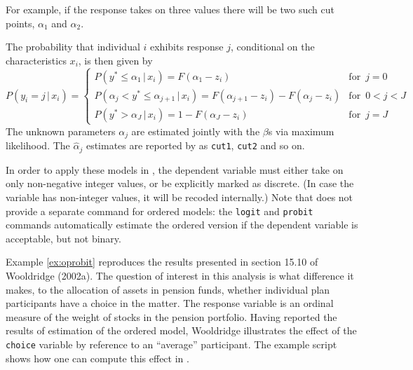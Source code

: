 For example, if the response takes on three values there will be two
such cut points, $\alpha_1$ and $\alpha_2$.

The probability that individual $i$ exhibits response $j$, conditional
on the characteristics $x_i$, is then given by
%
\begin{equation}
  \label{eq:QR-ordered}
  P(y_i = j \,|\, x_i) = \left\{
    \begin{array}{ll}
      P(y^* \leq \alpha_1 \,|\, x_i) = F(\alpha_1 - z_i) & \textrm{for }\, j = 0 \\
      P(\alpha_j < y^* \leq \alpha_{j+1} \,|\, x_i) = 
      F(\alpha_{j+1} - z_i) -  F(\alpha_j - z_i) & \textrm{for }\, 0 < j < J \\
      P(y^* > \alpha_J \,|\, x_i) = 1 -  F(\alpha_J - z_i) & \textrm{for }\, j = J 
    \end{array}
    \right.
\end{equation}
%
The unknown parameters $\alpha_j$ are estimated jointly with the
$\beta$s via maximum likelihood.  The $\hat{\alpha}_j$ estimates are
reported by  as \texttt{cut1}, \texttt{cut2} and so on.

In order to apply these models in , the dependent variable
must either take on only non-negative integer values, or be explicitly
marked as discrete.  (In case the variable has non-integer values, it
will be recoded internally.)  Note that  does not provide a
separate command for ordered models: the \texttt{logit} and
\texttt{probit} commands automatically estimate the ordered version if
the dependent variable is acceptable, but not binary.

Example \ref{ex:oprobit} reproduces the results presented in section
15.10 of Wooldridge (2002a).  The question of interest in this
analysis is what difference it makes, to the allocation of assets
in pension funds, whether individual plan participants have a
choice in the matter.  The response variable is an ordinal measure of
the weight of stocks in the pension portfolio.  Having reported the
results of estimation of the ordered model, Wooldridge illustrates the
effect of the \texttt{choice} variable by reference to an ``average''
participant.  The example script shows how one can compute this effect
in .  

